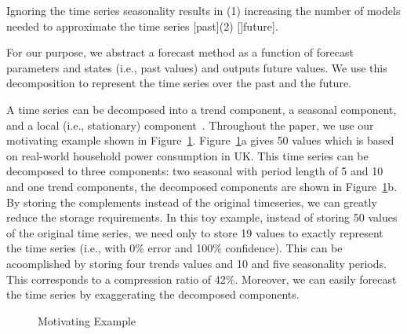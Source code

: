 Ignoring the time series seasonality  results in (1) increasing the number of models needed to approximate the time series [past](2) []future]. 






   
 For our purpose, we abstract a forecast method as a function of forecast parameters and states (i.e., past values) and outputs future values. We use this decomposition to represent the time series over the past and the future.
 
 

A time series  can be decomposed into a trend component, a seasonal component, and a local (i.e., stationary) component~\cite{Decompose}. 
Throughout the paper, we use our motivating example shown in Figure~\ref{fig:example}. 
Figure~\ref{fig:example}a gives 50 values which is based on real-world household power consumption in UK.  This time series can be decomposed to three components: two seasonal with period length of 5 and 10  and one trend components, the decomposed components are  shown in Figure~\ref{fig:example}b. 
By storing the complements instead of the original timeseries,  we can greatly reduce the storage requirements. In this toy example, instead of storing  50 values of the original time series, we need only to store 19 values to exactly represent the time series (i.e., with 0\% error and 100\% confidence). This can be acoomplished by storing  four trends values and  10 and five seasonality periods. This corresponds to a compression ratio of 42\%. Moreover, we can easily forecast the time series by exaggerating the decomposed components.
\begin{figure}[th]
\center
{}
\caption{Motivating Example}
\label{fig:example}
\end{figure} 

